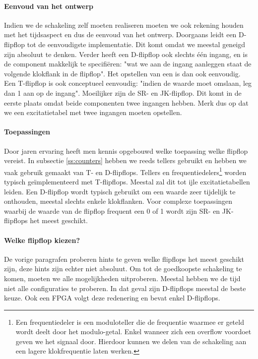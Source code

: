 \paragraph{Eenvoud van het ontwerp}Indien we de schakeling zelf moeten realiseren moeten we ook rekening houden met het tijdsaspect en dus de eenvoud van het ontwerp. Doorgaans leidt een D-flipflop tot de eenvoudigste implementatie. Dit komt omdat we meestal geneigd zijn absoluut te denken. Verder heeft een D-flipflop ook slechts \'e\'en ingang, en is de component makkelijk te specifi\"eren: "wat we aan de ingang aanleggen staat de volgende klokflank in de flipflop". Het opstellen van een  is dan ook eenvoudig. Een T-flipflop is ook conceptueel eenvoudig: "indien de waarde moet omslaan, leg dan 1 aan op de ingang". Moeilijker zijn de SR- en JK-flipflop. Dit komt in de eerste plaats omdat beide componenten twee ingangen hebben. Merk dus op dat we een excitatietabel met twee ingangen moeten opstellen.
\paragraph{Toepassingen}Door jaren ervaring heeft men kennis opgebouwd welke toepassing welke flipflop vereist. In subsectie \ref{ss:counters} hebben we reeds tellers gebruikt en hebben we vaak gebruik gemaakt van T- en D-flipflops. Tellers en frequentiedelers\footnote{Een frequentiedeler is een moduloteller die de frequentie waarmee er geteld wordt deelt door het modulo-getal. Enkel wanneer zich een overflow voordoet geven we het signaal door. Hierdoor kunnen we delen van de schakeling aan een lagere klokfrequentie laten werken.} worden typisch ge\"implementeerd met T-flipflops. Meestal zal dit tot ijle excitatietabellen leiden. Een D-flipflop wordt typisch gebruikt om een waarde zeer tijdelijk te onthouden, meestal slechts enkele klokflanken. Voor complexe toepassingen waarbij de waarde van de flipflop frequent een 0 of 1 wordt zijn SR- en JK-flipflops het meest geschikt.
\paragraph{Welke flipflop kiezen?}De vorige paragrafen proberen hints te geven welke flipflops het meest geschikt zijn, deze hints zijn echter niet absoluut. Om tot de goedkoopste schakeling te komen, moeten we alle mogelijkheden uitproberen. Meestal hebben we de tijd niet alle configuraties te proberen. In dat geval zijn D-flipflops meestal de beste keuze. Ook een FPGA volgt deze redenering en bevat enkel D-flipflops.
